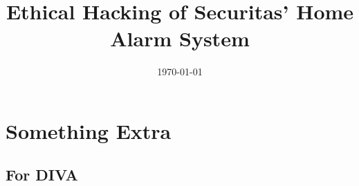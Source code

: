\documentclass[english]{kththesis}
\date{\today}
\title{Ethical Hacking of Securitas' Home Alarm System}
\begin{document}

\label{pg:lastPageofPreface}

\mainmatter







\printbibliography[title=References]

\appendix
\renewcommand{\chaptermark}[1]{\markboth{Appendix \thechapter\relax:\thinspace\relax#1}{}}
\chapter{Something Extra}

\label{pg:lastPageofMainmatter}

\clearpage
\section*{For DIVA}
\end{document}

